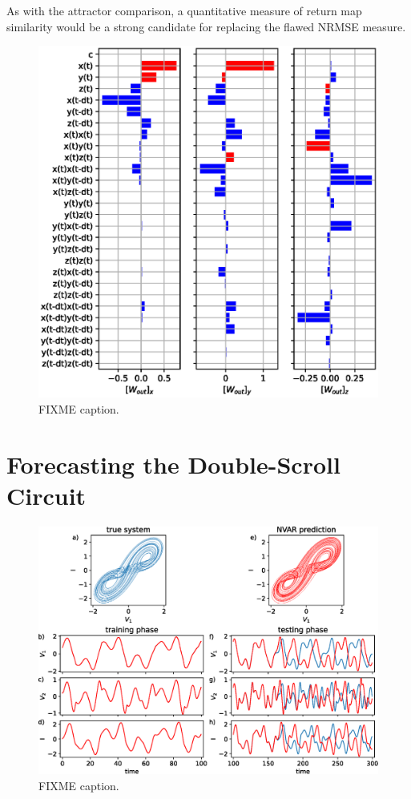 As with the attractor comparison, a quantitative measure of return map
similarity would be a strong candidate for replacing the flawed NRMSE
measure.


\begin{figure}
  \includegraphics{figures/nvar-predict-lorenz-wout}
  \caption{FIXME caption.}
  \label{fig:nvar-predict-lorenz-wout}
\end{figure}

\section{Forecasting the Double-Scroll Circuit}

\begin{figure}
  \includegraphics[width=\textwidth]{figures/nvar-predict-dscroll}
  \caption{FIXME caption.}
  \label{fig:nvar-predict-dscroll}
\end{figure}

